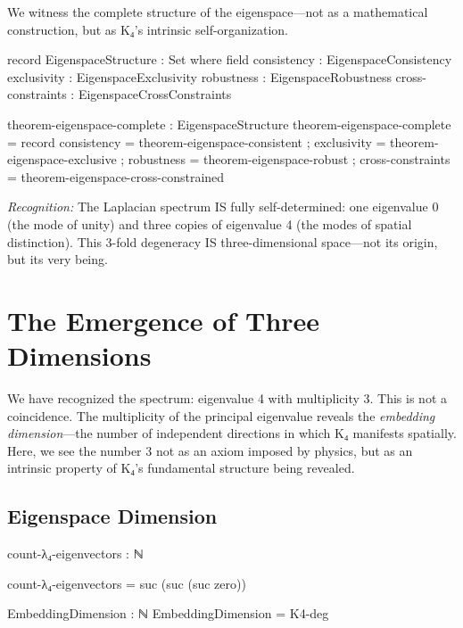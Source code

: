 \documentclass[11pt,a4paper]{book}
\begin{document}
We witness the complete structure of the eigenspace—not as a mathematical construction, but as K₄'s intrinsic self-organization.

\begin{code}
record EigenspaceStructure : Set where
  field
    consistency      : EigenspaceConsistency
    exclusivity      : EigenspaceExclusivity
    robustness       : EigenspaceRobustness
    cross-constraints : EigenspaceCrossConstraints

theorem-eigenspace-complete : EigenspaceStructure
theorem-eigenspace-complete = record
  { consistency = theorem-eigenspace-consistent
  ; exclusivity = theorem-eigenspace-exclusive
  ; robustness = theorem-eigenspace-robust
  ; cross-constraints = theorem-eigenspace-cross-constrained
  }
\end{code}

\medskip
\noindent\textit{Recognition:} The Laplacian spectrum IS fully self-determined: one eigenvalue 0 
(the mode of unity) and three copies of eigenvalue 4 (the modes of spatial distinction). This 3-fold degeneracy IS three-dimensional space—not its origin, but its very being.


\chapter{The Emergence of Three Dimensions}
\label{chap:three-dimensions}

We have recognized the spectrum: eigenvalue 4 with multiplicity 3. This is not a coincidence. 
The multiplicity of the principal eigenvalue reveals the \emph{embedding dimension}—the 
number of independent directions in which K₄ manifests spatially. Here, we see the 
number 3 not as an axiom imposed by physics, but as an intrinsic property of K₄'s 
fundamental structure being revealed.

\section{Eigenspace Dimension}

\begin{code}
count-λ₄-eigenvectors : ℕ

count-λ₄-eigenvectors = suc (suc (suc zero))

EmbeddingDimension : ℕ
EmbeddingDimension = K4-deg

\end{code}
\end{document}
